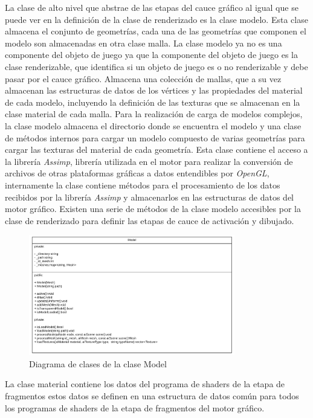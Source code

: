 \documentclass[a4paper]{book}
\begin{document}
La clase de alto nivel que abstrae de las etapas del cauce gráfico al igual que se puede ver en la definición de la clase de renderizado es
la clase modelo. Esta clase almacena el conjunto de geometrías, cada una de las geometrías que componen el modelo son almacenadas en otra
clase malla. La clase modelo ya no es una componente del objeto de juego ya que la componente del objeto de juego
es la clase renderizable, que identifica si un objeto de juego es o no renderizable y debe pasar por el cauce gráfico. Almacena una colección
de mallas, que a su vez almacenan las estructuras de datos de los vértices y las propiedades del material de cada modelo,
incluyendo la definición de las texturas que se almacenan en la clase material de cada malla. Para la realización de carga de modelos complejos, la
clase modelo almacena el directorio donde se encuentra el modelo y una clase de métodos internos para cargar un modelo compuesto de
varias geometrías para cargar las texturas del material de cada geometría. Esta clase contiene el acceso a la librería \textit{Assimp}, librería
utilizada en el motor para realizar la conversión de archivos de otras plataformas gráficas a datos entendibles por \textit{OpenGL}, internamente
la clase contiene métodos para el procesamiento de los datos recibidos por la librería \textit{Assimp} y almacenarlos en las estructuras de datos
del motor gráfico. Existen una serie de métodos de la clase modelo accesibles por la clase de renderizado para definir las etapas de cauce de
activación y dibujado.

\begin{figure}[H]
    \centering
    \includegraphics[width=9cm, keepaspectratio]{img/Model.png}
    \caption{Diagrama de clases de la clase Model}
    \label{Model}
\end{figure}

La clase material contiene los datos del programa de shaders de la etapa de fragmentos estos datos se definen en una estructura de
datos común para todos los programas de shaders de la etapa de fragmentos del motor gráfico.
\end{document}
